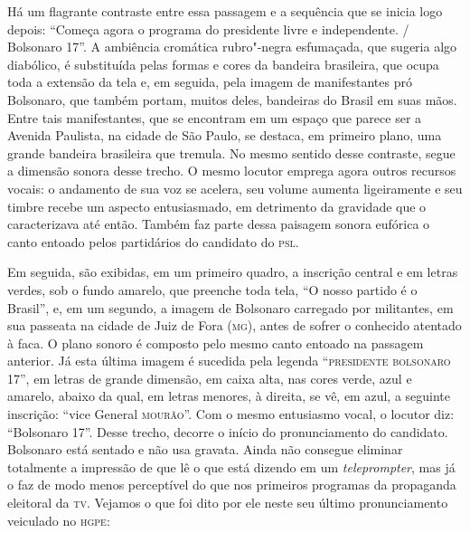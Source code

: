 Há um flagrante contraste entre essa passagem e a sequência que se
inicia logo depois: ``Começa agora o programa do presidente livre e
independente. / Bolsonaro 17''. A ambiência cromática rubro"-negra
esfumaçada, que sugeria algo diabólico, é substituída pelas formas e
cores da bandeira brasileira, que ocupa toda a extensão da tela e, em
seguida, pela imagem de manifestantes pró Bolsonaro, que também portam,
muitos deles, bandeiras do Brasil em suas mãos. Entre tais
manifestantes, que se encontram em um espaço que parece ser a Avenida
Paulista, na cidade de São Paulo, se destaca, em primeiro plano, uma
grande bandeira brasileira que tremula. No mesmo sentido desse
contraste, segue a dimensão sonora desse trecho. O mesmo locutor emprega
agora outros recursos vocais: o andamento de sua voz se acelera, seu
volume aumenta ligeiramente e seu timbre recebe um aspecto entusiasmado,
em detrimento da gravidade que o caracterizava até então. Também faz
parte dessa paisagem sonora eufórica o canto entoado pelos partidários
do candidato do \textsc{psl}.

Em seguida, são exibidas, em um primeiro quadro, a inscrição central e
em letras verdes, sob o fundo amarelo, que preenche toda tela, ``O nosso
partido é o Brasil'', e, em um segundo, a imagem de Bolsonaro carregado
por militantes, em sua passeata na cidade de Juiz de Fora (\textsc{mg}), antes de
sofrer o conhecido atentado à faca. O plano sonoro é composto pelo mesmo
canto entoado na passagem anterior. Já esta última imagem é sucedida
pela legenda ``\textsc{presidente bolsonaro} 17'', em letras de grande dimensão,
em caixa alta, nas cores verde, azul e amarelo, abaixo da qual, em
letras menores, à direita, se vê, em azul, a seguinte inscrição: ``vice
General \textsc{mourão}''. Com o mesmo entusiasmo vocal, o locutor diz:
``Bolsonaro 17''. Desse trecho, decorre o início do pronunciamento do
candidato. Bolsonaro está sentado e não usa gravata. Ainda não consegue
eliminar totalmente a impressão de que lê o que está dizendo em um
\emph{teleprompter}, mas já o faz de modo menos perceptível do que nos
primeiros programas da propaganda eleitoral da \textsc{tv}. Vejamos o que foi
dito por ele neste seu último pronunciamento veiculado no \textsc{hgpe}:

